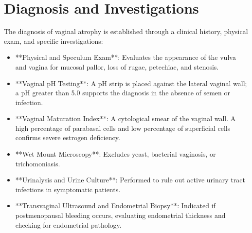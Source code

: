 \section*{Diagnosis and Investigations}
The diagnosis of vaginal atrophy is established through a clinical history, physical exam, and specific investigations:
\begin{itemize}
\item **Physical and Speculum Exam**: Evaluates the appearance of the vulva and vagina for mucosal pallor, loss of rugae, petechiae, and stenosis.
\item **Vaginal pH Testing**: A pH strip is placed against the lateral vaginal wall; a pH greater than 5.0 supports the diagnosis in the absence of semen or infection.
\item **Vaginal Maturation Index**: A cytological smear of the vaginal wall. A high percentage of parabasal cells and low percentage of superficial cells confirms severe estrogen deficiency.
\item **Wet Mount Microscopy**: Excludes yeast, bacterial vaginosis, or trichomoniasis.
\item **Urinalysis and Urine Culture**: Performed to rule out active urinary tract infections in symptomatic patients.
\item **Transvaginal Ultrasound and Endometrial Biopsy**: Indicated if postmenopausal bleeding occurs, evaluating endometrial thickness and checking for endometrial pathology.
\end{itemize}

